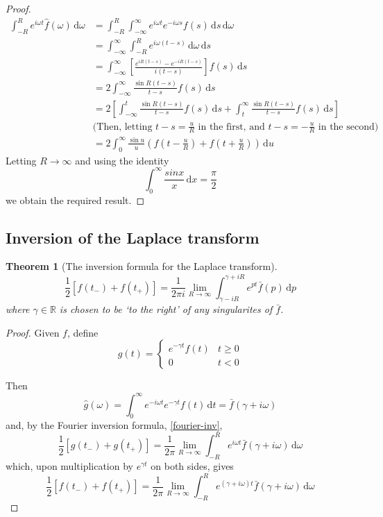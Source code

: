 \documentclass[10pt,fleqn]{article}
\newcommand{\diff}{\,\mathrm{d}}
\newcommand{\reals}{\mathbb{R}}
\theoremstyle{definition} \newtheorem{defn}{Definition}[section]
\theoremstyle{plain}      \newtheorem{thm}[defn]{Theorem}
\theoremstyle{plain}      \newtheorem{lem}[defn]{Lemma}
\theoremstyle{definition} \newtheorem{prop}[defn]{Proposition}
\theoremstyle{definition} \newtheorem{cor}[defn]{Corollary}
\theoremstyle{definition} \newtheorem{ex}[defn]{Example}
\theoremstyle{definition} \newtheorem{rem}[defn]{Remark}
\begin{document}
{\begin{proof}
    \begin{align*}
        \int_{-R}^R e^{i\omega t}\hat{f}(\omega)\diff\omega
        &=\int_{-R}^R\int_{-\infty}^{\infty}e^{i\omega t}e^{-i\omega s}f(s)\diff s\diff\omega\\
        &=\int_{-\infty}^{\infty}\int_{-R}^R e^{i\omega(t-s)}\diff\omega\diff s\\
        &=\int_{-\infty}^{\infty}\left[\frac{e^{iR(t-s)}-e^{-iR(t-s)}}{i(t-s)}\right]f(s)\diff s\\
        &=2\int_{-\infty}^{\infty}\frac{\sin R(t-s)}{t-s}f(s)\diff s\\
        &=2\left[\int_{-\infty}^t\frac{\sin R(t-s)}{t-s}f(s)\diff s+\int_t^{\infty}\frac{\sin R(t-s)}{t-s}f(s)\diff s\right]\\
        &\text{(Then, letting $t-s=\frac{u}{R}$ in the first, and $t-s=-\frac{u}{R}$ in the second)}\\
        &=2\int_0^{\infty}\frac{\sin u}{u}\left(f(t-\frac{u}{R})+f(t+\frac{u}{R})\right)\diff u
    \end{align*}
    Letting $R\to\infty$ and using the identity
    \[
        \int_0^{\infty}\frac{sin x}{x}\diff x=
        \frac{\pi}{2}
    \]
    we obtain the required result.
\end{proof}

\subsection{Inversion of the Laplace transform}

\begin{thm}[The inversion formula for the Laplace transform]
    \begin{equation}
        \frac{1}{2}[f(t_-)+f(t_+)]=
        \frac{1}{2\pi i}\lim_{R\to\infty}\int_{\gamma-iR}^{\gamma+iR} e^{pt}\bar{f}(p)\diff p
    \end{equation}
    where $\gamma\in\reals$ is chosen to be `to the right' of any singularites of $\bar{f}$.
\end{thm}

\begin{proof}
    Given $f$, define
    \[
        g(t)=\left\{
        \begin{array}{ll}
            e^{-\gamma t}f(t) & t\geq 0\\
            0 & t<0
        \end{array}\right.
    \]

    Then
    \[
        \hat{g}(\omega)=
        \int_0^{\infty} e^{-i\omega t}e^{-\gamma t}f(t)\diff t=
        \bar{f}(\gamma+i\omega)
    \]
    and, by the Fourier inversion formula, \ref{fourier-inv},
    \[
        \frac{1}{2}[g(t_-)+g(t_+)]=
        \frac{1}{2\pi}\lim_{R\to\infty}\int_{-R}^R e^{i\omega t}\bar{f}(\gamma+i\omega)\diff\omega
    \]
    which, upon multiplication by $e^{\gamma t}$ on both sides, gives
    \[
        \frac{1}{2}[f(t_-)+f(t_+)]=
        \frac{1}{2\pi}\lim_{R\to\infty}\int_{-R}^R e^{(\gamma+i\omega)t}\bar{f}(\gamma+i\omega)\diff\omega
    \]


\end{proof}}
\end{document}
